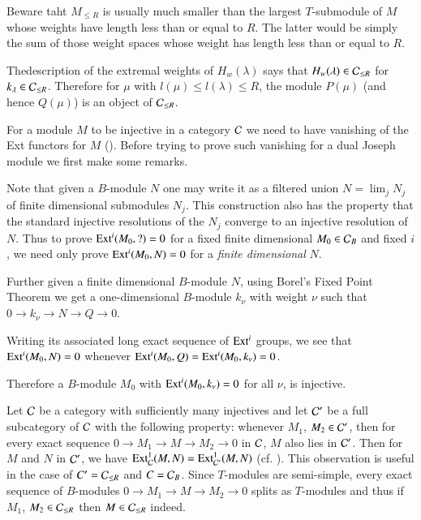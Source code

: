 \begin{remark}\label{chap3-rem3.1.4}
Beware taht $M_{\leq R}$ is usually much smaller than the largest
$T$-submodule of $M$ whose weights have length less than or equal to
$R$. The latter would be simply the sum of those weight spaces whose
weight has length less than or equal to $R$.
\end{remark}

\begin{remark}\label{chap3-rem3.1.5}
The\pageoriginale description\label{page24} of the extremal weights of
$H_{w}(\lambda)$ says that $H_{w}(\lambda)\in \mathcal{C}_{\leq R}$ for
$k_{\lambda}\in \mathcal{C}_{\leq R}$. Therefore for $\mu$ with $l(\mu)\leq
l(\lambda)\leq R$, the module $P(\mu)$ (and hence $Q(\mu)$) is an
object of $\mathcal{C}_{\leq R}$.
\end{remark}

For a module $M$ to be injective in a category $\mathcal{C}$ we need to have
vanishing of the Ext functors 
for $M$ (\cite[Ch III]{key23}). Before
trying to prove such vanishing for a dual Joseph module we first make
some remarks.

\begin{remark}\label{chap3-rem3.1.6}
Note that given a $B$-module $N$ one may write it as a filtered union
$N=\lim_{j}N_{j}$ of finite dimensional submodules $N_{j}$. This
construction also has the property that the standard injective
resolutions \cite[Hochschild complex]{key11} of the $N_{j}$ converge
to an injective resolution of $N$. Thus to prove $\operatorname{Ext}^{i}(M_{0},?)=0$
for a fixed finite dimensional $M_{0}\in\mathcal{C}_{B}$ and fixed $i$, we need
only prove $\operatorname{Ext}^{i}(M_{0},N)=0$ for a {\em finite dimensional} $N$.
\end{remark}

\begin{remark}\label{chap3-rem3.1.7}
Further given a finite dimensional $B$-module $N$, using Borel's Fixed
Point Theorem we get a one-dimensional $B$-module $k_{\nu}$ with
weight $\nu$ such that $0\to k_{\nu}\to N\to Q\to 0$. 
\end{remark}

Writing its associated long exact sequence of $\operatorname{Ext}^{i}$ groups, we
see that $\operatorname{Ext}^{i}(M_{0},N)=0$ whenever
$\operatorname{Ext}^{i}(M_{0},Q)=\operatorname{Ext}^{i}(M_{0},k_{\nu})=0$. 

Therefore a $B$-module $M_{0}$ with $\operatorname{Ext}^{i}(M_{0},k_{\nu})=0$ for
all $\nu$, is injective.

\begin{remark}\label{chap3-rem3.1.8}
Let $\mathcal{C}$ be a category with sufficiently many injectives and let $\mathcal{C}'$
be a full subcategory of $\mathcal{C}$ with the following property: whenever
$M_{1}$, $M_{2}\in \mathcal{C}'$, then for every exact sequence $0\to M_{1}\to
M\to M_{2}\to 0$ in $\mathcal{C}$, $M$ also lies in $\mathcal{C}'$. Then for $M$ and $N$
in $\mathcal{C}'$, we have $\operatorname{Ext}^{1}_{\mathcal{C}}(M,N)=\operatorname{Ext}^{1}_{\mathcal{C}'}(M,N)$ (cf.\@
\cite[Ch III \S 1, \S 8]{key23}). This observation is useful in the
case of $C'=\mathcal{C}_{\leq R}$ and $C=\mathcal{C}_{B}$. Since $T$-modules are
semi-simple, every exact sequence of $B$-modules $0\to M_{1}\to M\to
M_{2}\to 0$ splits as $T$-modules and thus if $M_{1}$, $M_{2}\in
\mathcal{C}_{\leq R}$ then $M\in \mathcal{C}_{\leq R}$ indeed.
\end{remark}

